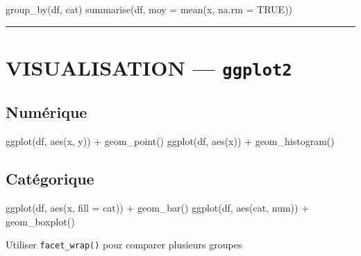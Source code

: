 \documentclass[
  french,
  8pt,
  letterpaper,
  DIV=11,
  numbers=noendperiod]{scrartcl}
\newenvironment{Shaded}{\begin{snugshade}}{\end{snugshade}}
\newcommand{\AttributeTok}[1]{\textcolor[rgb]{0.40,0.45,0.13}{#1}}
\newcommand{\ConstantTok}[1]{\textcolor[rgb]{0.56,0.35,0.01}{#1}}
\newcommand{\FunctionTok}[1]{\textcolor[rgb]{0.28,0.35,0.67}{#1}}
\newcommand{\NormalTok}[1]{\textcolor[rgb]{0.00,0.23,0.31}{#1}}
\newcommand{\SpecialCharTok}[1]{\textcolor[rgb]{0.37,0.37,0.37}{#1}}
\begin{document}
\begin{Shaded}
\begin{Highlighting}[]
\FunctionTok{group\_by}\NormalTok{(df, cat)}
\FunctionTok{summarise}\NormalTok{(df, }\AttributeTok{moy =} \FunctionTok{mean}\NormalTok{(x, }\AttributeTok{na.rm =} \ConstantTok{TRUE}\NormalTok{))}
\end{Highlighting}
\end{Shaded}

\begin{center}\rule{0.5\linewidth}{0.5pt}\end{center}

\section{\texorpdfstring{ VISUALISATION ---
\texttt{ggplot2}}{ VISUALISATION --- ggplot2}}\label{visualisation-ggplot2}

\subsection{Numérique}\label{numuxe9rique}

\begin{Shaded}
\begin{Highlighting}[]
\FunctionTok{ggplot}\NormalTok{(df, }\FunctionTok{aes}\NormalTok{(x, y)) }\SpecialCharTok{+} \FunctionTok{geom\_point}\NormalTok{()}
\FunctionTok{ggplot}\NormalTok{(df, }\FunctionTok{aes}\NormalTok{(x)) }\SpecialCharTok{+} \FunctionTok{geom\_histogram}\NormalTok{()}
\end{Highlighting}
\end{Shaded}

\subsection{Catégorique}\label{catuxe9gorique}

\begin{Shaded}
\begin{Highlighting}[]
\FunctionTok{ggplot}\NormalTok{(df, }\FunctionTok{aes}\NormalTok{(x, }\AttributeTok{fill =}\NormalTok{ cat)) }\SpecialCharTok{+} \FunctionTok{geom\_bar}\NormalTok{()}
\FunctionTok{ggplot}\NormalTok{(df, }\FunctionTok{aes}\NormalTok{(cat, num)) }\SpecialCharTok{+} \FunctionTok{geom\_boxplot}\NormalTok{()}
\end{Highlighting}
\end{Shaded}

 Utiliser \texttt{facet\_wrap()} pour comparer plusieurs groupes
\end{document}
